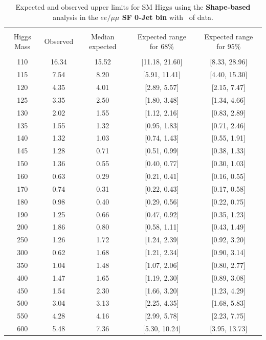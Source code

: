 \begin{table}[hbp!]
\begin{center}
\begin{tabular}{c c c c c}
\hline
\vspace{-3mm} && \\
 Higgs Mass & Observed  & Median expected & Expected range for 68\% & Expected range for 95\%   \\
\vspace{-3mm} && \\
\hline
110 & 16.34 & 15.52 & [11.18, 21.60] & [8.33, 28.96] \\
115 & 7.54 & 8.20 & [5.91, 11.41] & [4.40, 15.30] \\
120 & 4.35 & 4.01 & [2.89, 5.57] & [2.15, 7.47] \\
125 & 3.35 & 2.50 & [1.80, 3.48] & [1.34, 4.66] \\
130 & 2.02 & 1.55 & [1.12, 2.16] & [0.83, 2.89] \\
135 & 1.55 & 1.32 & [0.95, 1.83] & [0.71, 2.46] \\
140 & 1.32 & 1.03 & [0.74, 1.43] & [0.55, 1.91] \\
145 & 1.28 & 0.71 & [0.51, 0.99] & [0.38, 1.33] \\
150 & 1.36 & 0.55 & [0.40, 0.77] & [0.30, 1.03] \\
160 & 0.63 & 0.29 & [0.21, 0.41] & [0.16, 0.55] \\
170 & 0.74 & 0.31 & [0.22, 0.43] & [0.17, 0.58] \\
180 & 0.98 & 0.40 & [0.29, 0.56] & [0.22, 0.75] \\
190 & 1.25 & 0.66 & [0.47, 0.92] & [0.35, 1.23] \\
200 & 1.86 & 0.80 & [0.58, 1.11] & [0.43, 1.49] \\
250 & 1.26 & 1.72 & [1.24, 2.39] & [0.92, 3.20] \\
300 & 0.62 & 1.68 & [1.21, 2.34] & [0.90, 3.14] \\
350 & 1.04 & 1.48 & [1.07, 2.06] & [0.80, 2.77] \\
400 & 1.47 & 1.65 & [1.19, 2.30] & [0.89, 3.08] \\
450 & 1.54 & 2.30 & [1.66, 3.20] & [1.23, 4.29] \\
500 & 3.04 & 3.13 & [2.25, 4.35] & [1.68, 5.83] \\
550 & 4.28 & 4.16 & [2.99, 5.78] & [2.23, 7.75] \\
600 & 5.48 & 7.36 & [5.30, 10.24] & [3.95, 13.73] \\
\hline
\end{tabular}
\caption{Expected and observed upper limits for SM Higgs using the
  {\bf Shape-based} analysis in the {\bf $ee/\mu\mu$ SF 0-Jet bin} with \intlumiEightTeV\ of data.}
\label{tab:bdtbase_uls_0jsf}
\end{center}
\end{table}
